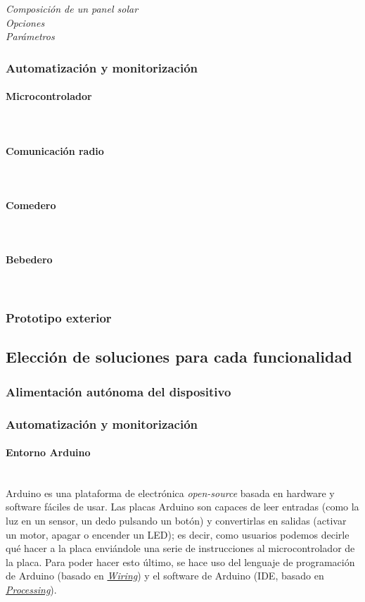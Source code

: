 \documentclass[12pt]{article}
\newcommand{\subsubsubsection}[1]{\paragraph{#1}\mbox{}\\}
\begin{document}
	\noindent \textit{Composición de un panel solar} \\
	
	\noindent \textit{Opciones}\\
	
	\noindent \textit{Parámetros}\\
	
	\subsubsection{Automatización y monitorización}
	
	\subsubsubsection{Microcontrolador}
	\subsubsubsection{Comunicación radio}
	\subsubsubsection{Comedero}
	\subsubsubsection{Bebedero}
		
	\subsubsection{Prototipo exterior}

	
	\subsection[Elección soluciones]{Elección de soluciones para cada funcionalidad}
	
	\subsubsection{Alimentación autónoma del dispositivo}
	\subsubsection{Automatización y monitorización}
	\subsubsubsection{Entorno Arduino}
	
	
	Arduino es una plataforma de electrónica \textit{open-source} basada en hardware y software fáciles de usar. Las placas Arduino son capaces de leer entradas (como la luz en un sensor, un dedo pulsando un botón) y convertirlas en salidas (activar un motor, apagar o encender un LED); es decir, como usuarios podemos decirle qué hacer a la placa enviándole una serie de instrucciones al microcontrolador de la placa. Para poder hacer esto último, se hace uso del lenguaje de programación de Arduino (basado en \href{http://wiring.org.co/}{\textit{Wiring}}) y el software de Arduino (IDE, basado en \href{https://processing.org/}{\textit{Processing}}). \\
	
\end{document}

